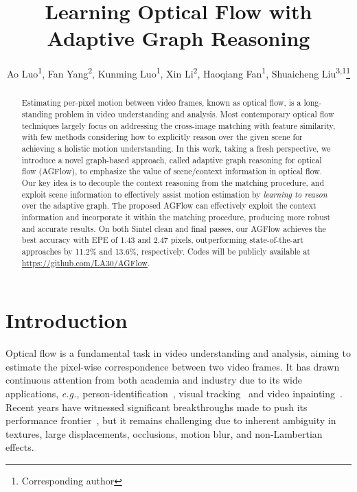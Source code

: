\documentclass[letterpaper]{article} %
\title{Learning Optical Flow with Adaptive Graph Reasoning}
\author{
Ao Luo\textsuperscript{\rm 1}, Fan Yang\textsuperscript{\rm 2}, Kunming Luo\textsuperscript{\rm 1}, Xin Li\textsuperscript{\rm 2}, Haoqiang Fan\textsuperscript{\rm 1}, Shuaicheng Liu\textsuperscript{\rm 3,1}\thanks{Corresponding author}\\
}
\begin{document}
\maketitle


\begin{abstract}

Estimating per-pixel motion between video frames, known as optical flow, is a long-standing problem in video understanding and analysis. Most contemporary optical flow techniques largely focus on addressing the cross-image matching with feature similarity, with few methods considering how to explicitly reason over the given scene for achieving a holistic motion understanding. In this work, taking a fresh perspective, we introduce a novel graph-based approach, called adaptive graph reasoning for optical flow (AGFlow), to emphasize the value of scene/context information in optical flow. Our key idea is to decouple the context reasoning from the matching procedure, and exploit scene information to effectively assist motion estimation by \emph{learning to reason} over the adaptive graph. The proposed AGFlow can effectively exploit the context information and incorporate it within the matching procedure, producing more robust and accurate results. On both Sintel clean and final passes, our AGFlow achieves the best accuracy with EPE of 1.43 and 2.47 pixels, outperforming state-of-the-art approaches by 11.2\% and 13.6\%, respectively. Codes will be publicly available at \url{https://github.com/LA30/AGFlow}.

\end{abstract}


\section{Introduction}

Optical flow is a fundamental task in video understanding and analysis, aiming to estimate the pixel-wise correspondence between two video frames. It has drawn continuous attention from both academia and industry due to its wide applications, \emph{e.g.,}  person-identification~\cite{chen2020frame}, visual tracking~\cite{vihlman2020optical} and video inpainting~\cite{Xu_2019_CVPR}. Recent years have witnessed significant breakthroughs made to push its performance frontier~\cite{Dosovitskiy2015FlowNetLO, Ilg2017FlowNet2E,Teed2020RAFTRA, Jiang2021LearningOF}, but it remains challenging due to inherent ambiguity in textures, large displacements, occlusions, motion blur, and non-Lambertian effects.
\end{document}
